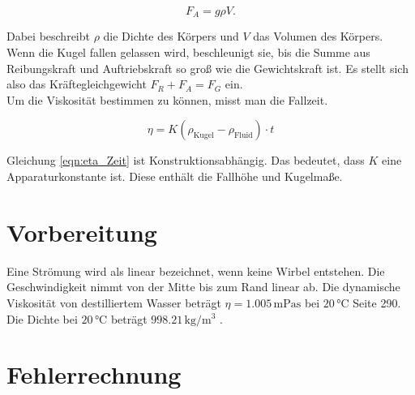 \begin{equation*}
    F_A = g \rho V.
\end{equation*}

\noindent
Dabei beschreibt $\rho$ die Dichte des Körpers und $V$ das Volumen des Körpers.\\
\noindent
Wenn die Kugel fallen gelassen wird, beschleunigt sie, bis die Summe aus Reibungskraft und Auftriebskraft so groß wie die Gewichtskraft 
ist. Es stellt sich also das Kräftegleichgewicht $F_R + F_A = F_G$ ein.\\
\noindent
Um die Viskosität bestimmen zu können, misst man die Fallzeit.

\begin{equation}
    \eta = K(\rho_\text{Kugel} - \rho_\text{Fluid}) \cdot t
    \label{eqn:eta_Zeit}
\end{equation}

\noindent
Gleichung \eqref{eqn:eta_Zeit} ist Konstruktionsabhängig. Das bedeutet, dass $K$ eine Apparaturkonstante ist. Diese enthält die Fallhöhe 
und Kugelmaße.






\section{Vorbereitung}
Eine Strömung wird als linear bezeichnet, wenn keine Wirbel entstehen. Die Geschwindigkeit nimmt von der Mitte bis zum Rand linear ab.
Die dynamische Viskosität von destilliertem Wasser beträgt $\eta = 1.005\, \unit{\milli \pascal \second}$ bei $20\, \unit{\celsius}$ 
\cite{Physikalisches_Praktikum} Seite 290. Die Dichte bei $20\, \unit{\celsius}$ beträgt $998.21\, \unit{\kilo \gram \per \cubic \meter}$
\cite{Physikalisches_Praktikum}.

\section{Fehlerrechnung}
